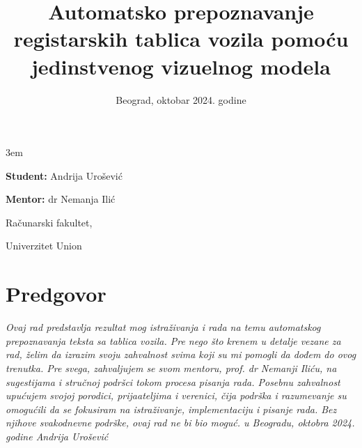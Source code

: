\documentclass[a4paper,12pt]{article}
\title{Automatsko prepoznavanje registarskih tablica vozila pomoću jedinstvenog vizuelnog modela}
\date{}
\begin{document}
	\emergencystretch 3em
	\begin{titlepage}
		\centering
		{\huge\bfseries \maketitle}
		
		{\large
			\textbf{Student:}
			Andrija Urošević
			\par
			\bigskip
			\textbf{Mentor:}
			dr Nemanja Ilić
		}
	
		\vfill
		{\large Računarski fakultet,\par}
		{\large Univerzitet Union\par}
		\bigskip
		\date{Beograd, oktobar 2024. godine}
	\end{titlepage}
	
	
	\section*{Predgovor}
	\noindent
	\textit{Ovaj rad predstavlja rezultat mog istraživanja i rada na temu automatskog prepoznavanja teksta sa tablica vozila. Pre nego što krenem u detalje vezane za rad, želim da izrazim svoju zahvalnost svima koji su mi pomogli da dođem do ovog trenutka.
	\newline
	\newline
	Pre svega, zahvaljujem se svom mentoru, prof. dr Nemanji Iliću, na sugestijama i stručnoj podršci tokom procesa pisanja rada.
	\newline
	\newline
	Posebnu zahvalnost upućujem svojoj porodici, prijaateljima i verenici, čija podrška i razumevanje su omogućili da se fokusiram na istraživanje, implementaciju i pisanje rada. Bez njihove svakodnevne podrške, ovaj rad ne bi bio moguć.
	\newline
	\newline	
	u Beogradu, oktobra 2024. godine
	\newline
	Andrija Urošević}
	\newpage
	
	\tableofcontents
	\newpage
	
	
\end{document}
